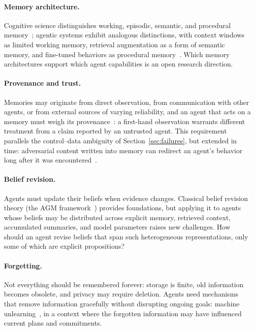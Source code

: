 \documentclass[11pt]{article}
\begin{document}
\paragraph{Memory architecture.} Cognitive science distinguishes working, episodic, semantic, and procedural memory~\cite{squire_memory}; agentic systems exhibit analogous distinctions, with context windows as limited working memory, retrieval augmentation as a form of semantic memory, and fine-tuned behaviors as procedural memory~\cite{sumers_coala}. Which memory architectures support which agent capabilities is an open research direction.

\paragraph{Provenance and trust.} Memories may originate from direct observation, from communication with other agents, or from external sources of varying reliability, and an agent that acts on a memory must weigh its provenance~\cite{buneman_provenance}: a first-hand observation warrants different treatment from a claim reported by an untrusted agent. This requirement parallels the control--data ambiguity of Section~\ref{sec:failures}, but extended in time: adversarial content written into memory can redirect an agent's behavior long after it was encountered~\cite{agentpoison}.

\paragraph{Belief revision.} Agents must update their beliefs when evidence changes. Classical belief revision theory (the AGM framework~\cite{agm}) provides foundations, but applying it to agents whose beliefs may be distributed across explicit memory, retrieved context, accumulated summaries, and model parameters raises new challenges. How should an agent revise beliefs that span such heterogeneous representations, only some of which are explicit propositions?

\paragraph{Forgetting.} Not everything should be remembered forever: storage is finite, old information becomes obsolete, and privacy may require deletion. Agents need mechanisms that remove information gracefully without disrupting ongoing goals: machine unlearning~\cite{bourtoule_unlearning}, in a context where the forgotten information may have influenced current plans and commitments.
\end{document}
